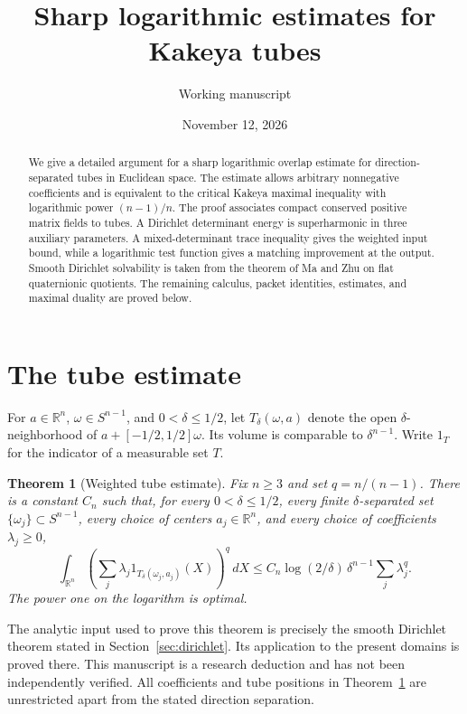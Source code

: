 \documentclass[11pt]{article}
\title{Sharp logarithmic estimates for Kakeya tubes}
\author{Working manuscript}
\date{November 12, 2026}
\newtheorem{theorem}{Theorem}
\numberwithin{equation}{section}
\newcommand{\R}{\mathbb R}
\newcommand{\dd}{\,d}
\begin{document}
\maketitle

\begin{abstract}
We give a detailed argument for a sharp logarithmic overlap estimate
for direction-separated tubes in Euclidean space. The estimate allows
arbitrary nonnegative coefficients and is equivalent to the critical
Kakeya maximal inequality with logarithmic power $(n-1)/n$.
The proof associates compact conserved positive matrix fields to
tubes. A Dirichlet determinant energy is superharmonic in three
auxiliary parameters. A mixed-determinant trace inequality gives the
weighted input bound, while a logarithmic test function gives a
matching improvement at the output. Smooth Dirichlet solvability is
taken from the theorem of Ma and Zhu on flat quaternionic quotients.
The remaining calculus, packet identities, estimates, and maximal
duality are proved below.
\end{abstract}

\section{The tube estimate}

For $a\in\R^n$, $\omega\in S^{n-1}$, and $0<\delta\le1/2$, let
$T_\delta(\omega,a)$ denote the open $\delta$-neighborhood of
$a+[-1/2,1/2]\omega$. Its volume is comparable to $\delta^{n-1}$.
Write $1_T$ for the indicator of a measurable set $T$.

\begin{theorem}[Weighted tube estimate]\label{thm:tubes}
Fix $n\ge3$ and set $q=n/(n-1)$. There is a constant $C_n$ such that,
for every $0<\delta\le1/2$, every finite $\delta$-separated set
$\{\omega_j\}\subset S^{n-1}$, every choice of centers
$a_j\in\R^n$, and every choice of coefficients $\lambda_j\ge0$,
\begin{equation}\label{eq:maintubes}
 \int_{\R^n}\left(\sum_j\lambda_j
              1_{T_\delta(\omega_j,a_j)}(X)\right)^q\dd X
 \le C_n\log(2/\delta)\,\delta^{n-1}\sum_j\lambda_j^q.
\end{equation}
The power one on the logarithm is optimal.
\end{theorem}

The analytic input used to prove this theorem is precisely the smooth
Dirichlet theorem stated in Section~\ref{sec:dirichlet}.
Its application to the present domains is proved there.
This manuscript is a research deduction and has not been independently
verified. All coefficients and tube positions in
Theorem~\ref{thm:tubes} are unrestricted apart from the stated
direction separation.
\end{document}

